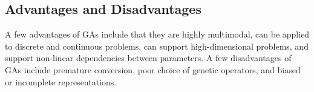 \documentclass[12pt,titlepage]{article}
\begin{document}
    \subsection{Advantages and Disadvantages}
      A few advantages of GAs include that they are highly multimodal, can be applied to discrete and continuous problems, can support high-dimensional
      problems, and support non-linear dependencies between parameters. A few disadvantages of GAs include premature conversion, poor choice of genetic
      operators, and biased or incomplete representations.
\end{document}
